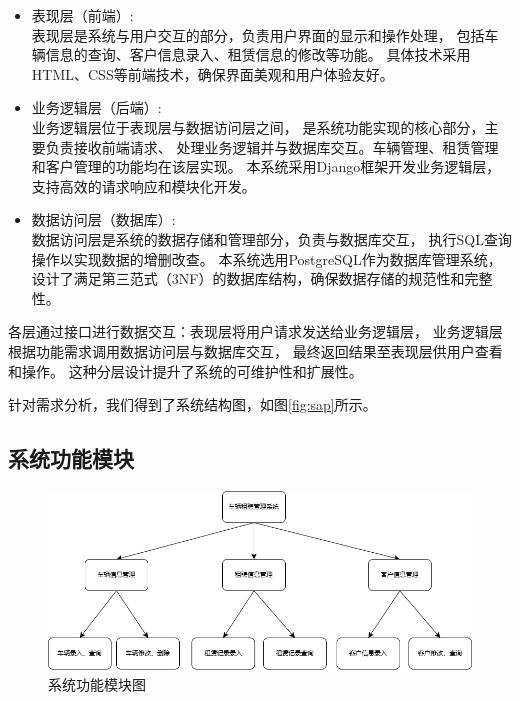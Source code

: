\documentclass[UTF8,a4paper,12pt]{ctexart}
\begin{document}
\begin{itemize}
    \item 表现层（前端）:\\
    表现层是系统与用户交互的部分，负责用户界面的显示和操作处理，
    包括车辆信息的查询、客户信息录入、租赁信息的修改等功能。
    具体技术采用HTML、CSS等前端技术，确保界面美观和用户体验友好。
    \item 业务逻辑层（后端）:\\
    业务逻辑层位于表现层与数据访问层之间，
    是系统功能实现的核心部分，主要负责接收前端请求、
    处理业务逻辑并与数据库交互。车辆管理、租赁管理和客户管理的功能均在该层实现。
    本系统采用Django框架开发业务逻辑层，
    支持高效的请求响应和模块化开发。
    
    \item 数据访问层（数据库）:\\
    数据访问层是系统的数据存储和管理部分，负责与数据库交互，
    执行SQL查询操作以实现数据的增删改查。
    本系统选用PostgreSQL作为数据库管理系统，
    设计了满足第三范式（3NF）的数据库结构，确保数据存储的规范性和完整性。
\end{itemize}

各层通过接口进行数据交互：表现层将用户请求发送给业务逻辑层，
业务逻辑层根据功能需求调用数据访问层与数据库交互，
最终返回结果至表现层供用户查看和操作。
这种分层设计提升了系统的可维护性和扩展性。

针对需求分析，我们得到了系统结构图，如图\ref{fig:sap}所示。

\subsection{系统功能模块}

\begin{figure}[htbp]  %
    \centering  %
    \includegraphics[width=1\textwidth]{pic/system_function_modules.png}  %
    \caption{系统功能模块图}  %
    \label{fig:sfm}  %
\end{figure}
\end{document}

